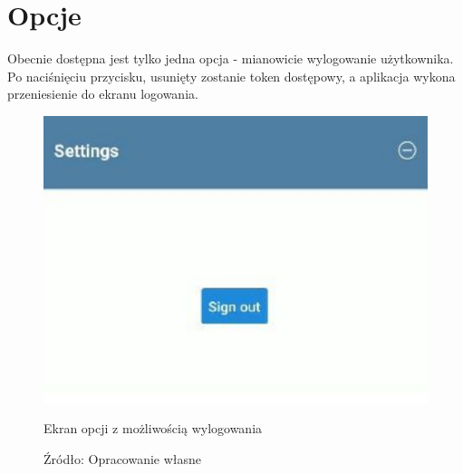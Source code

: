 \section{Opcje}
Obecnie dostępna jest tylko jedna opcja - mianowicie wylogowanie użytkownika. Po naciśnięciu przycisku, usunięty zostanie token dostępowy, a aplikacja wykona przeniesienie do ekranu logowania.
\begin{figure}[H]
	\centering
	\includegraphics{options.pdf}
	\caption{Ekran opcji z możliwością wylogowania}
	\caption*{Źródło: {Opracowanie własne}}
\end{figure}

